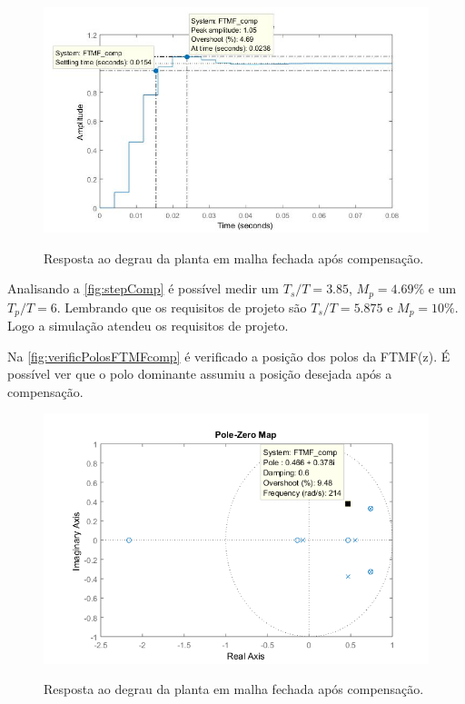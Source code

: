 \documentclass[
	article,			%
	11pt,				%
	oneside,			%
	a4paper,			%
	english,			%
	brazil,				%
	sumario=tradicional
	]{abntex2}
\begin{document}
\begin{figure}[htb!]
	\centering
	\caption{Resposta ao degrau da planta em malha fechada após compensação.}
	\includegraphics[scale=0.6]{./img/stepComp.JPG}
	\label{fig:stepComp}
\end{figure}

Analisando a \autoref{fig:stepComp} é possível medir um $T_s/T = 3.85$, $M_p = 4.69\%$ e um $T_p/T = 6$. 
Lembrando que os requisitos de projeto são $T_s/T = 5.875$ e $M_p = 10\%$. 
Logo a simulação atendeu os requisitos de projeto.

\pagebreak

Na \autoref{fig:verificPolosFTMFcomp} é verificado a posição dos polos da FTMF(z). 
É possível ver que o polo dominante assumiu a posição desejada após a compensação.

\begin{figure}[htb!]
	\centering
	\caption{Resposta ao degrau da planta em malha fechada após compensação.}
	\includegraphics[scale=0.9]{./img/verificPolosFTMFcomp.png}
	\label{fig:verificPolosFTMFcomp}
\end{figure}
\end{document}
